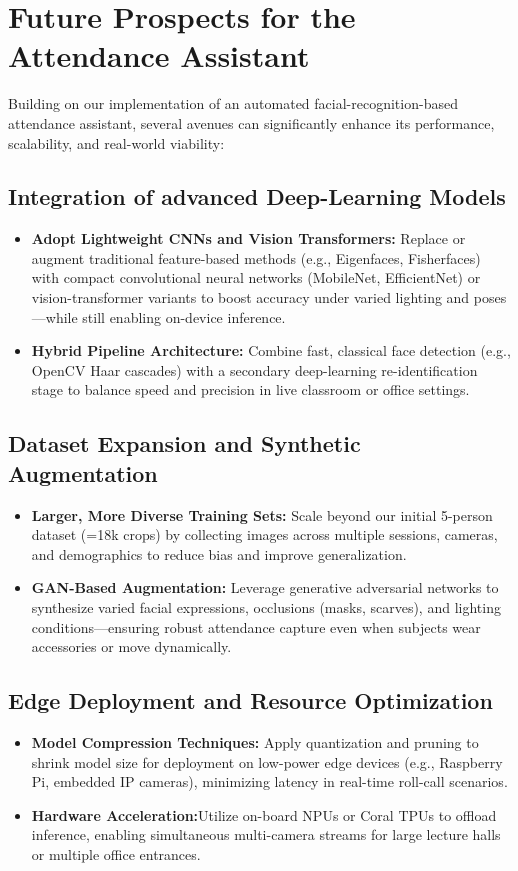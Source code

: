 \documentclass[openany]{report}
\begin{document}
\chapter{Future Prospects for the Attendance Assistant }
Building on our implementation of an automated facial-recognition-based attendance assistant, several avenues can significantly enhance its performance, scalability, and real-world viability:
\section{Integration of advanced Deep-Learning Models}
\begin{itemize}
    \item \textbf{Adopt Lightweight CNNs and Vision Transformers:} Replace or augment traditional feature-based methods (e.g., Eigenfaces, Fisherfaces) with compact convolutional neural networks (MobileNet, EfficientNet) or vision-transformer variants to boost accuracy under varied lighting and poses—while still enabling on-device inference.
    \item \textbf{Hybrid Pipeline Architecture:} Combine fast, classical face detection (e.g., OpenCV Haar cascades) with a secondary deep-learning re-identification stage to balance speed and precision in live classroom or office settings.
\end{itemize}
\section{Dataset Expansion and Synthetic Augmentation}
\begin{itemize}
    \item \textbf{Larger, More Diverse Training Sets:} Scale beyond our initial 5-person dataset (=18k crops) by collecting images across multiple sessions, cameras, and demographics to reduce bias and improve generalization.
    \item \textbf{GAN-Based Augmentation:} Leverage generative adversarial networks to synthesize varied facial expressions, occlusions (masks, scarves), and lighting conditions—ensuring robust attendance capture even when subjects wear accessories or move dynamically.
\end{itemize}

\section{Edge Deployment and Resource Optimization}
\begin{itemize}
    \item \textbf{Model Compression Techniques:} Apply quantization and pruning to shrink model size for deployment on low-power edge devices (e.g., Raspberry Pi, embedded IP cameras), minimizing latency in real-time roll-call scenarios.
    \item \textbf{Hardware Acceleration:}Utilize on-board NPUs or Coral TPUs to offload inference, enabling simultaneous multi-camera streams for large lecture halls or multiple office entrances.
\end{itemize}
\end{document}
